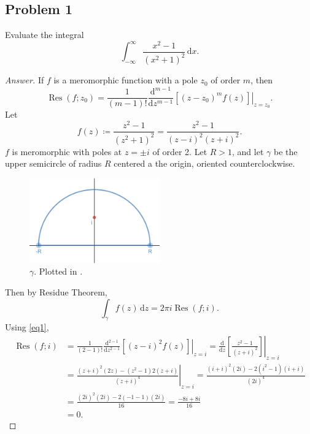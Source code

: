 \documentclass[12pt]{article}
\newcommand\paren[1]{\left( #1 \right)}
\newcommand{\sqbrack}[1]{\left [ #1 \right ]}
\theoremstyle{definition}
\DeclareMathOperator\Res{Res}
\begin{document}
\subsection{Problem 1 \texorpdfstring{\cite{Res}}{}}
Evaluate the integral 
\[
    \int_{-\infty}^{\infty} \frac{x^2 - 1}{(x^2+1)^2} \, \mathrm{d}x.
\]
\begin{proof}[Answer]
    If $f$ is a meromorphic function with a pole $z_0$ of order $m$, then 
    \begin{equation}\label{eq1}
        \Res(f;z_0) = \frac{1}{(m-1)!} \frac{\mathrm{d}^{m-1}}{\mathrm{d}z^{m-1}} \left. \sqbrack{ (z - z_0)^m f(z) } \right|_{z = z_0}.
    \end{equation}
    Let 
    \[
        f(z) \coloneqq \frac{z^2 - 1}{ \paren{ z^2 + 1 }^2 } = \frac{ z^2 - 1 }{ \paren{ z - i }^2 \paren{ z + i }^2 }.
    \]
    $f$ is meromorphic with poles at $z = \pm i$ of order 2. Let $R > 1$, and let $\gamma$ be the upper semicircle of radius $R$ centered a the origin, oriented counterclockwise.
    \begin{figure}[H]
        \centering
        \includegraphics[width = 0.5\textwidth]{3.png}
        \caption{$\gamma$. Plotted in \cite{Desmos}.}
        \label{fig:fig1}
    \end{figure}
    Then by Residue Theorem,
    \[
        \int_{\gamma} f(z) \, \mathrm{d}z = 2\pi i \Res(f;i).
    \]
    Using \eqref{eq1}, 
    \begin{align*}
        \Res(f;i) & = \frac{1}{(2-1)!}  \frac{\mathrm{d}^{2-1}}{\mathrm{d}z^{2-1}} \left. \sqbrack{ (z - i)^2 f(z) } \right|_{z = i} = \frac{ \mathrm{d} }{ \mathrm{d}z } \left. \sqbrack{ \frac{ z^2 - 1 }{ (z + i)^2} } \right|_{z = i} \\[0.2em]
        & = \left. \frac{ (z + i)^2 (2z) - (z^2 - 1) 2(z + i) }{ (z + i)^4 } \right|_{z = i} = \frac{ (i + i)^2 (2i) - 2(i^2 - 1)(i + i)  }{ (2i)^4 } \\[0.2em]
        & = \frac{ (2i)^2 (2i) - 2(-1 -1)(2i) }{16} = \frac{-8i + 8i}{16} \\
        & = 0.
    \end{align*}

\end{proof}
\end{document}
